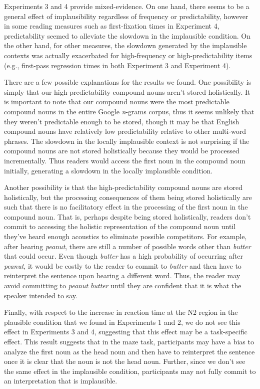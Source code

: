 \documentclass[
  12pt,
  letterpaper,
]{scrreprt}
\begin{document}
Experiments 3 and 4 provide mixed-evidence. On one hand, there seems to
be a general effect of implausibility regardless of frequency or
predictability, however in some reading measures such as first-fixation
times in Experiment 4, predictability seemed to alleviate the slowdown
in the implausible condition. On the other hand, for other measures, the
slowdown generated by the implausible contexts was actually exacerbated
for high-frequency or high-predictability items (e.g., first-pass
regression times in both Experiment 3 and Experiment 4).

There are a few possible explanations for the results we found. One
possibility is simply that our high-predictability compound nouns aren't
stored holistically. It is important to note that our compound nouns
were the most predictable compound nouns in the entire Google
\emph{n}-grams corpus, thus it seems unlikely that they weren't
predictable enough to be stored, though it may be that English compound
nouns have relatively low predictability relative to other multi-word
phrases. The slowdown in the locally implausible context is not
surprising if the compound nouns are not stored holistically because
they would be processed incrementally. Thus readers would access the
first noun in the compound noun initially, generating a slowdown in the
locally implausible condition.

Another possibility is that the high-predictability compound nouns are
stored holistically, but the processing consequences of them being
stored holistically are such that there is no facilitatory effect in the
processing of the first noun in the compound noun. That is, perhaps
despite being stored holistically, readers don't commit to accessing the
holistic representation of the compound noun until they've heard enough
acoustics to eliminate possible competitors. For example, after hearing
\emph{peanut}, there are still a number of possible words other than
\emph{butter} that could occur. Even though \emph{butter} has a high
probability of occurring after \emph{peanut}, it would be costly to the
reader to commit to \emph{butter} and then have to reinterpret the
sentence upon hearing a different word. Thus, the reader may avoid
committing to \emph{peanut butter} until they are confident that it is
what the speaker intended to say.

Finally, with respect to the increase in reaction time at the N2 region
in the plausible condition that we found in Experiments 1 and 2, we do
not see this effect in Experiments 3 and 4, suggesting that this effect
may be a task-specific effect. This result suggests that in the maze
task, participants may have a bias to analyze the first noun as the head
noun and then have to reinterpret the sentence once it is clear that the
noun is not the head noun. Further, since we don't see the same effect
in the implausible condition, participants may not fully commit to an
interpretation that is implausible.
\end{document}
